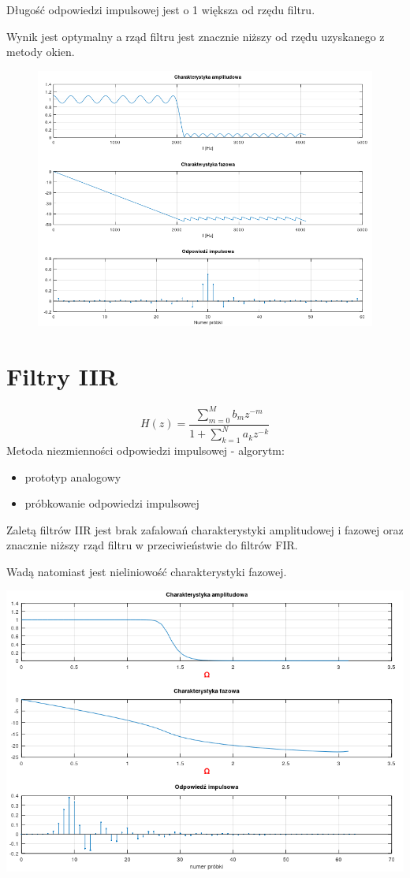 \documentclass[11pt]{article}
\begin{document}
Długość odpowiedzi impulsowej jest o 1 większa od rzędu filtru.

Wynik jest optymalny a rząd filtru jest znacznie niższy od rzędu uzyskanego z metody okien.
\begin{figure}[h]
    \centering
    \includegraphics[width=15cm]{fir_ap.png}
\end{figure}

\section{Filtry IIR}
\[ H(z) = \frac{\sum_{m=0}^{M}b_m z^{-m}}{1 + \sum_{k=1}^{N}a_k z^{-k}} \]
Metoda niezmienności odpowiedzi impulsowej - algorytm:
\begin{itemize}
	\item prototyp analogowy
	\item próbkowanie odpowiedzi impulsowej
\end{itemize}

Zaletą filtrów IIR jest brak zafalowań charakterystyki amplitudowej i fazowej oraz znacznie niższy rząd filtru w przeciwieństwie do filtrów FIR.

Wadą natomiast jest nieliniowość charakterystyki fazowej.

\begin{center}
\includegraphics[width=15cm]{iir.png}
\end{center}
\end{document}
